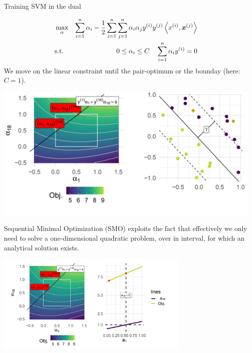 \begin{vbframe}{Training SVM in the dual}
\vspace{-0.5cm}
\begin{footnotesize}  
\begin{eqnarray*}
    & \max_{\alpha} & \sum_{i=1}^n \alpha_i - \frac{1}{2}\sum_{i=1}^n\sum_{j=1}^n\alpha_i\alpha_jy^{(i)} y^{(j)} \left\langle x^{(i)}, \bm{x}^{(j)} \right\rangle  \\
    & \text{s.t. } & 0 \le \alpha_i \le C \quad \sum_{i=1}^n \alpha_i y^{(i)} = 0
\end{eqnarray*}
We move on the linear constraint until the pair-optimum or the bounday (here: $C=1$).
\end{footnotesize}  

\vspace{0.1cm}

\begin{center}
\includegraphics[width = 9 cm ]{figure_man/SVM01.png} \\
\end{center}

    
\framebreak    
Sequential Minimal Optimization (SMO) exploits the fact that effectively 
we only need to solve a one-dimensional quadratic problem, over in interval, 
for which an analytical solution exists.
    
\vspace{0.2cm}    
\begin{center}
\includegraphics[width = 9.5cm ]{figure_man/SVM02.png} \\
\end{center}


\end{vbframe}



\endlecture


